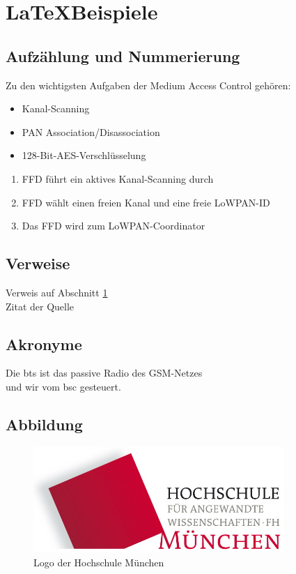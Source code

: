 \section{\LaTeX Beispiele}\label{sec:bsp}

\subsection{Aufzählung und Nummerierung}

Zu den wichtigsten Aufgaben der Medium Access Control gehören:
\begin{itemize}
  \item Kanal-Scanning
  \item PAN Association/Disassociation
  \item 128-Bit-AES-Verschlüsselung
\end{itemize}
\begin{enumerate}
  \item FFD führt ein aktives Kanal-Scanning durch
  \item FFD wählt einen freien Kanal und eine freie LoWPAN-ID
  \item Das FFD wird zum LoWPAN-Coordinator
\end{enumerate}

\subsection{Verweise}

Verweis auf Abschnitt \ref{sec:bsp} \\
Zitat der Quelle \cite{gk09}

\subsection{Akronyme}
Die \gls{bts} ist das passive Radio des GSM-Netzes \\
und wir vom \gls{bsc} gesteuert.

\subsection{Abbildung}

\begin{figure}[h!]
  \centering
  \includegraphics[width=0.85\textwidth]{img/hm.jpg}
  \caption{Logo der Hochschule München}
  \label{fig:HS}
\end{figure}

